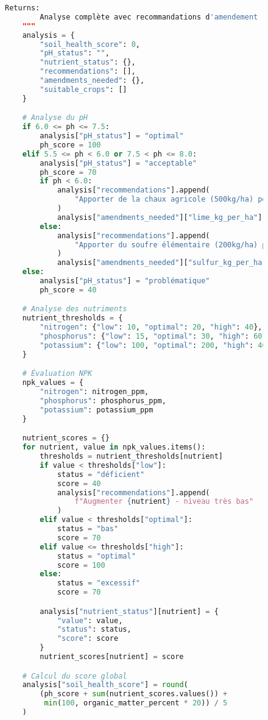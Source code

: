 \begin{figure}[H]
\begin{lstlisting}[language=Python, caption=Implémentation d'outils spécialisés pour l'agriculture]
    Returns:
        Analyse complète avec recommandations d'amendement
    """
    analysis = {
        "soil_health_score": 0,
        "pH_status": "",
        "nutrient_status": {},
        "recommendations": [],
        "amendments_needed": {},
        "suitable_crops": []
    }

    # Analyse du pH
    if 6.0 <= ph <= 7.5:
        analysis["pH_status"] = "optimal"
        ph_score = 100
    elif 5.5 <= ph < 6.0 or 7.5 < ph <= 8.0:
        analysis["pH_status"] = "acceptable"
        ph_score = 70
        if ph < 6.0:
            analysis["recommendations"].append(
                "Apporter de la chaux agricole (500kg/ha) pour augmenter le pH"
            )
            analysis["amendments_needed"]["lime_kg_per_ha"] = 500
        else:
            analysis["recommendations"].append(
                "Apporter du soufre élémentaire (200kg/ha) pour réduire le pH"
            )
            analysis["amendments_needed"]["sulfur_kg_per_ha"] = 200
    else:
        analysis["pH_status"] = "problématique"
        ph_score = 40

    # Analyse des nutriments
    nutrient_thresholds = {
        "nitrogen": {"low": 10, "optimal": 20, "high": 40},
        "phosphorus": {"low": 15, "optimal": 30, "high": 60},
        "potassium": {"low": 100, "optimal": 200, "high": 400}
    }

    # Évaluation NPK
    npk_values = {
        "nitrogen": nitrogen_ppm,
        "phosphorus": phosphorus_ppm,
        "potassium": potassium_ppm
    }

    nutrient_scores = {}
    for nutrient, value in npk_values.items():
        thresholds = nutrient_thresholds[nutrient]
        if value < thresholds["low"]:
            status = "déficient"
            score = 40
            analysis["recommendations"].append(
                f"Augmenter {nutrient} - niveau très bas"
            )
        elif value < thresholds["optimal"]:
            status = "bas"
            score = 70
        elif value <= thresholds["high"]:
            status = "optimal"
            score = 100
        else:
            status = "excessif"
            score = 70

        analysis["nutrient_status"][nutrient] = {
            "value": value,
            "status": status,
            "score": score
        }
        nutrient_scores[nutrient] = score

    # Calcul du score global
    analysis["soil_health_score"] = round(
        (ph_score + sum(nutrient_scores.values()) +
         min(100, organic_matter_percent * 20)) / 5
    )


\end{lstlisting}
\end{figure}
